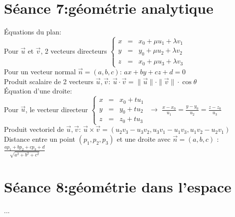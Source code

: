 \documentclass[12pt]{article}
\begin{document}
\section*{S\'eance 7:g\'eom\'etrie analytique}
\'Equations du plan: \\
\indent \indent Pour $\vec{u}$ et $\vec{v}$, 2 vecteurs directeurs
\(\left \lbrace
   \begin{array}{rcl}
      x & = & x_0+\mu u_1+\lambda v_1 \\
      y & = & y_0+ \mu u_2+\lambda v_2 \\
      z & = & x_0+ \mu u_3+\lambda v_3
   \end{array}
\right. \) \\ \newline
\indent \indent Pour un vecteur normal $\vec{n} = (a, b, c)$: $ax+by+cz+d=0$ \\ \newline
\indent Produit scalaire de 2 vecteurs $\vec{u}, \vec{v}$:
$\vec{u}\cdot\vec{v} = \|\vec{u}\| \cdot \|\vec{v}\| \cdot \cos{\theta}$ \\ \newline
\indent \'Equation d'une droite: \\
\indent \indent Pour $\vec{u}$, le vecteur directeur
\(\left \lbrace
	\begin{array}{rcl}
		x & = & x_0+tu_1 \\
		y & = & y_0+tu_2 \\
		z & = & z_0+tu_3
	\end{array} \right. \) $\rightarrow$ $\frac{x-x_0}{u_1} = \frac{y-y_0}{u_2} = \frac{z-z_0}{u_3}$ \\

\indent Produit vectoriel de $\vec{u}, \vec{v}$: $\vec{u} \times \vec{v} = (u_2v_3 - u_3v_2, u_3v_1 - u_1v_3, u_1v_2 - u_2v_1)$ \\

\indent Distance entre un point $(p_1, p_2, p_3)$ et une droite avec $\vec{n} = (a, b, c)$ : $\frac{ap_1+bp_2+cp_3+d}{\sqrt{a^2+b^2+c^2}}$
\section*{S\'eance 8:g\'eom\'etrie dans l'espace}
...
\end{document}
